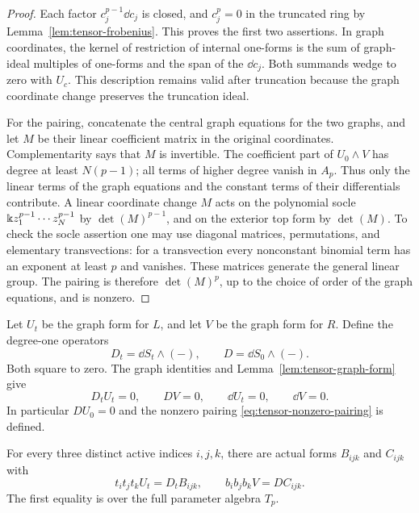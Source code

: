 \begin{proof}
Each factor \(c_j^{p-1}\dd c_j\) is closed, and \(c_j^p=0\) in the
truncated ring by Lemma~\ref{lem:tensor-frobenius}.
This proves the first two assertions.
In graph coordinates, the kernel of restriction of internal one-forms is
the sum of graph-ideal multiples of one-forms and the span of the
\(\dd c_j\).  Both summands wedge to zero with \(U_c\).
This description remains valid after truncation because the graph
coordinate change preserves the truncation ideal.

For the pairing, concatenate the central graph equations for the two
graphs, and let \(M\) be their linear coefficient matrix in the original
coordinates.  Complementarity says that \(M\) is invertible.
The coefficient part of \(U_0\wedge V\) has degree at least \(N(p-1)\);
all terms of higher degree vanish in \(A_p\).
Thus only the linear terms of the graph equations and the constant terms
of their differentials contribute.  A linear coordinate change \(M\)
acts on the polynomial socle
\(\Bbbk z_1^{p-1}\cdots z_N^{p-1}\) by \(\det(M)^{p-1}\), and on the
exterior top form by \(\det(M)\).  To check the socle assertion one may
use diagonal matrices, permutations, and elementary transvections:
for a transvection every nonconstant binomial term has an exponent at
least \(p\) and vanishes.  These matrices generate the general linear
group.  The pairing is therefore \(\det(M)^p\), up to the choice of order
of the graph equations, and is nonzero.
\end{proof}

Let \(U_t\) be the graph form for \(L\), and let \(V\) be the graph form
for \(R\).  Define the degree-one operators
\[
       D_t=\dd S_t\wedge(-),\qquad D=\dd S_0\wedge(-).
\]
Both square to zero.  The graph identities and
Lemma~\ref{lem:tensor-graph-form} give
\begin{equation}\label{eq:tensor-graph-cycles}
 D_tU_t=0,\qquad DV=0,\qquad
 \dd U_t=0,\qquad\dd V=0 .
\end{equation}
In particular \(DU_0=0\) and the nonzero pairing
\eqref{eq:tensor-nonzero-pairing} is defined.

\begin{lemma}\label{lem:tensor-membership-boundary}
For every three distinct active indices \(i,j,k\), there are actual forms
\(B_{ijk}\) and \(C_{ijk}\) with
\begin{equation}\label{eq:tensor-actual-boundaries}
 t_i t_j t_k U_t=D_t B_{ijk},\qquad
 b_i b_j b_k V=D C_{ijk}.
\end{equation}
The first equality is over the full parameter algebra \(T_p\).
\end{lemma}

